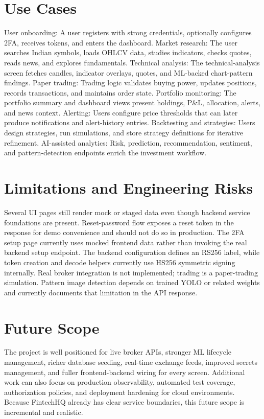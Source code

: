 \documentclass[11pt,a4paper]{article}
\begin{document}
\section{Use Cases}
User onboarding: A user registers with strong credentials, optionally configures 2FA, receives tokens, and enters the dashboard. Market research: The user searches Indian symbols, loads OHLCV data, studies indicators, checks quotes, reads news, and explores fundamentals. Technical analysis: The technical-analysis screen fetches candles, indicator overlays, quotes, and ML-backed chart-pattern findings. Paper trading: Trading logic validates buying power, updates positions, records transactions, and maintains order state. Portfolio monitoring: The portfolio summary and dashboard views present holdings, P\&L, allocation, alerts, and news context. Alerting: Users configure price thresholds that can later produce notifications and alert-history entries. Backtesting and strategies: Users design strategies, run simulations, and store strategy definitions for iterative refinement. AI-assisted analytics: Risk, prediction, recommendation, sentiment, and pattern-detection endpoints enrich the investment workflow.
\section{Limitations and Engineering Risks}
Several UI pages still render mock or staged data even though backend service foundations are present. Reset-password flow exposes a reset token in the response for demo convenience and should not do so in production. The 2FA setup page currently uses mocked frontend data rather than invoking the real backend setup endpoint. The backend configuration defines an RS256 label, while token creation and decode helpers currently use HS256 symmetric signing internally. Real broker integration is not implemented; trading is a paper-trading simulation. Pattern image detection depends on trained YOLO or related weights and currently documents that limitation in the API response.
\section{Future Scope}
The project is well positioned for live broker APIs, stronger ML lifecycle management, richer database seeding, real-time exchange feeds, improved secrets management, and fuller frontend-backend wiring for every screen. Additional work can also focus on production observability, automated test coverage, authorization policies, and deployment hardening for cloud environments. Because FintechHQ already has clear service boundaries, this future scope is incremental and realistic.
\end{document}
